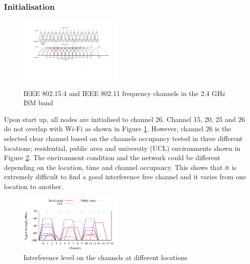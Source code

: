 \subsubsection{Initialisation}
\begin{figure}
\centering
\includegraphics[trim=3cm 8cm 2cm 2cm, clip=true, width=0.45\textwidth]{figures/freqBand.pdf}
\caption{IEEE 802.15.4 and IEEE 802.11 frequency channels in the 2.4 GHz ISM band}
\label{fig:freqBand}
\end{figure}

Upon start up, all nodes are initialised to channel 26. 
Channel 15, 20, 25 and 26 do not overlap with Wi-Fi as shown in Figure \ref{fig:freqBand}. However, channel 26 is the selected clear channel based on the channels occupancy tested in three different locations; residential, public area and university (UCL) environments shown in Figure \ref{fig:interference2}. The environment condition and the network could be different depending on the location, time and channel occupancy. This shows that it is extremely difficult to find a good interference free channel and it varies from one location to another.

\begin{figure}
\centering
\includegraphics[width=0.45\textwidth]{figures/interference.pdf}
\caption{Interference level on the channels at different locations}
\label{fig:interference2}
\end{figure}

